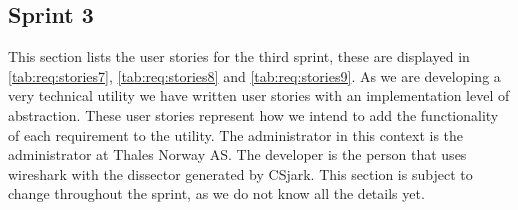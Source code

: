 \subsection{Sprint 3}
\label{sec:req:stories3}
This section lists the user stories for the third sprint, these are displayed in \autoref{tab:req:stories7}, \autoref{tab:req:stories8} and \autoref{tab:req:stories9}.
As we are developing a very technical \gls{utility} we have written user stories with an implementation level of abstraction. 
These user stories represent how we intend to add the functionality of each requirement to the \gls{utility}.
The administrator in this context is the administrator at Thales Norway AS. 
The developer is the person that uses \Gls{wireshark} with the \gls{dissector} generated by CSjark.
This section is subject to change throughout the sprint, as we do not know all the details yet.


